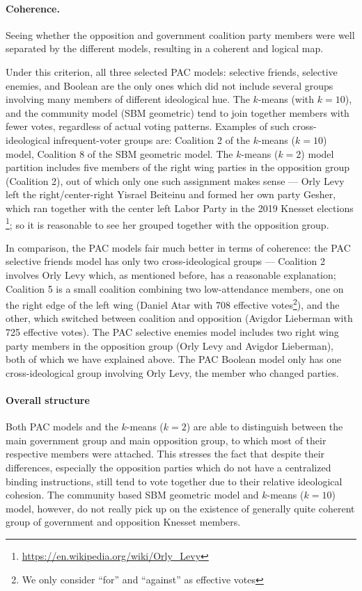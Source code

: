 \paragraph{Coherence.}
Seeing whether the opposition and government coalition party members were well
separated by the different models, resulting in a coherent and logical map.

Under this criterion, all three selected PAC models: selective friends,
selective enemies, and Boolean are the only ones which did not include several
groups involving many members of different ideological hue.
The $k$-means (with $k=10$), and the community model (SBM geometric) tend to
join together members with fewer votes, regardless of actual voting patterns.
Examples of such cross-ideological infrequent-voter groups are: Coalition 2
of the $k$-means ($k=10$) model, Coalition 8 of the SBM geometric model.
The $k$-means ($k=2$) model partition includes five members of the right wing
parties in the opposition group (Coalition 2), out of which only one such
assignment makes sense --- Orly Levy left the right/center-right Yisrael
Beiteinu and formed her own party Gesher, which ran together with the center
left Labor Party in the 2019 Knesset elections
\footnote{\url{https://en.wikipedia.org/wiki/Orly_Levy}}; so it is reasonable to
see her grouped together with the opposition group.

In comparison, the PAC models fair much better in terms of coherence:
the PAC selective friends model has only two cross-ideological groups ---
Coalition 2 involves Orly Levy which, as mentioned before, has a reasonable
explanation; Coalition 5 is a small coalition combining two low-attendance
members, one on the right edge of the left wing (Daniel Atar with 708 effective
votes\footnote{We only consider ``for'' and ``against'' as effective votes}),
and the other, which switched between coalition and opposition
(Avigdor Lieberman with 725 effective votes).
The PAC selective enemies model includes two right wing party members in the
opposition group (Orly Levy and Avigdor Lieberman), both of which we have
explained above.
The PAC Boolean model only has one cross-ideological group involving Orly Levy,
the member who changed parties.

\paragraph{Overall structure}
Both PAC models and the $k$-means ($k=2$) are able to distinguish between the
main government group and main opposition group, to which most
of their respective members were attached.
This stresses the fact that despite their differences, especially the opposition
parties which do not have a centralized binding instructions, still tend to
vote together due to their relative ideological cohesion.
The community based SBM geometric model and  $k$-means ($k=10$) model, however,
do not really pick up on the existence of generally quite coherent group of
government and opposition Knesset members.

